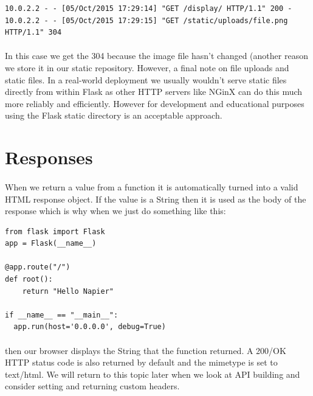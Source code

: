\documentclass[12pt, a4paper, oneside]{book}
\begin{document}
\begin{lstlisting}[style=DOS]
10.0.2.2 - - [05/Oct/2015 17:29:14] "GET /display/ HTTP/1.1" 200 -
10.0.2.2 - - [05/Oct/2015 17:29:15] "GET /static/uploads/file.png HTTP/1.1" 304
\end{lstlisting}

\paragraph{} In this case we get the 304 because the image file hasn't changed (another reason we store it in our static repository. However, a final note on file uploads and static files. In a real-world deployment we usually wouldn't serve static files directly from within Flask as other HTTP servers like NGinX can do this much more reliably and efficiently. However for development and educational purposes using the Flask static directory is an acceptable approach.


\section{Responses}
\label{responses}
\paragraph{} When we return a value from a function it is automatically turned into a valid HTML response object. If the value is a String then it is used as the body of the response which is why when we just do something like this:

\begin{lstlisting}
from flask import Flask
app = Flask(__name__)

@app.route("/")
def root():
    return "Hello Napier"

if __name__ == "__main__":
  app.run(host='0.0.0.0', debug=True)
\end{lstlisting}

\paragraph{} then our browser displays the String that the function returned. A 200/OK HTTP status code is also returned by default and the mimetype is set to text/html. We will return to this topic later when we look at API building and consider setting and returning custom headers.



\end{document}
